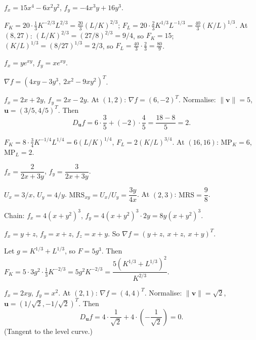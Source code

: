\begin{solutions}
  \item $f_x=15x^4-6x^2y^2$, $f_y=-4x^3y+16y^3$.

  \item $F_K=20\cdot\frac13K^{-2/3}L^{2/3}=\frac{20}{3}(L/K)^{2/3}$;
        $F_L=20\cdot\frac23K^{1/3}L^{-1/3}=\frac{40}{3}(K/L)^{1/3}$. At
        $(8,27)$: $(L/K)^{2/3}=(27/8)^{2/3}=9/4$, so $F_K=15$;
        $(K/L)^{1/3}=(8/27)^{1/3}=2/3$, so
        $F_L=\frac{40}{3}\cdot\frac23=\frac{80}{9}$.

  \item $f_x=ye^{xy}$, $f_y=xe^{xy}$.

  \item $\nabla f=(4xy-3y^3,\ 2x^2-9xy^2)^T$.

  \item $f_x=2x+2y$, $f_y=2x-2y$. At $(1,2)$: $\nabla f=(6,-2)^T$.
        Normalise: $\|\mathbf{v}\|=5$, $\mathbf{u}=(3/5,4/5)^T$. Then
        \[
          D_{\mathbf{u}}f=6\cdot\frac35+(-2)\cdot\frac45
            =\frac{18-8}{5}=2 .
        \]

  \item $F_K=8\cdot\frac34K^{-1/4}L^{1/4}=6(L/K)^{1/4}$,
        $F_L=2(K/L)^{3/4}$. At $(16,16)$: $\mathrm{MP}_K=6$,
        $\mathrm{MP}_L=2$.

  \item $f_x=\dfrac{2}{2x+3y}$, $f_y=\dfrac{3}{2x+3y}$.

  \item $U_x=3/x$, $U_y=4/y$.
        $\mathrm{MRS}_{xy}=U_x/U_y=\dfrac{3y}{4x}$. At $(2,3)$:
        $\mathrm{MRS}=\dfrac98$.

  \item Chain: $f_x=4(x+y^2)^3$,
        $f_y=4(x+y^2)^3\cdot2y=8y(x+y^2)^3$.

  \item $f_x=y+z$, $f_y=x+z$, $f_z=x+y$. So
        $\nabla f=(y+z,\ x+z,\ x+y)^T$.

  \item Let $g=K^{1/3}+L^{1/3}$, so $F=5g^3$. Then
        $F_K=5\cdot3g^2\cdot\frac13K^{-2/3}=5g^2K^{-2/3}
        =\dfrac{5(K^{1/3}+L^{1/3})^2}{K^{2/3}}$.

  \item $f_x=2xy$, $f_y=x^2$. At $(2,1)$: $\nabla f=(4,4)^T$. Normalise:
        $\|\mathbf{v}\|=\sqrt2$, $\mathbf{u}=(1/\sqrt2,-1/\sqrt2)^T$.
        Then
        \[
          D_{\mathbf{u}}f=4\cdot\frac{1}{\sqrt2}
            +4\cdot\left(-\frac{1}{\sqrt2}\right)=0 .
        \]
        (Tangent to the level curve.)


\end{solutions}

